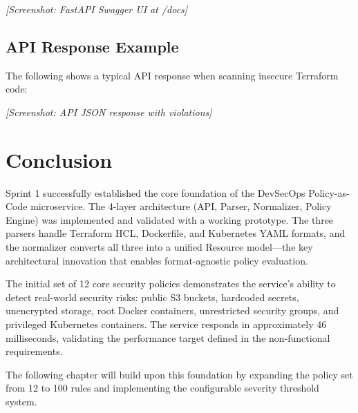 
\textit{[Screenshot: FastAPI Swagger UI at /docs]}

\subsection{API Response Example}

The following shows a typical API response when scanning insecure Terraform code:


\textit{[Screenshot: API JSON response with violations]}

\section{Conclusion}

Sprint 1 successfully established the core foundation of the DevSecOps Policy-as-Code microservice. The 4-layer architecture (API, Parser, Normalizer, Policy Engine) was implemented and validated with a working prototype. The three parsers handle Terraform HCL, Dockerfile, and Kubernetes YAML formats, and the normalizer converts all three into a unified Resource model—the key architectural innovation that enables format-agnostic policy evaluation.

The initial set of 12 core security policies demonstrates the service's ability to detect real-world security risks: public S3 buckets, hardcoded secrets, unencrypted storage, root Docker containers, unrestricted security groups, and privileged Kubernetes containers. The service responds in approximately 46 milliseconds, validating the performance target defined in the non-functional requirements.

The following chapter will build upon this foundation by expanding the policy set from 12 to 100 rules and implementing the configurable severity threshold system.
